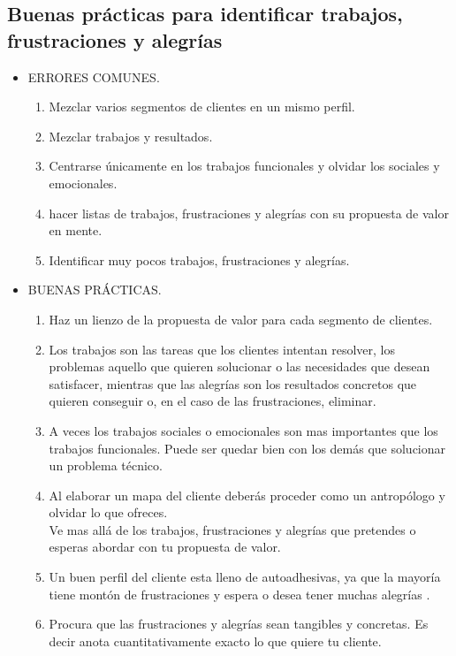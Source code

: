 \documentclass[11pt]{book}
\begin{document}
\subsection{Buenas prácticas para identificar trabajos, frustraciones y alegrías}
\begin{itemize}
\item ERRORES COMUNES.
\begin{enumerate}
\item Mezclar varios segmentos de clientes en un mismo perfil.
\item Mezclar trabajos y resultados.
\item Centrarse únicamente en los trabajos funcionales y olvidar los sociales y emocionales.
\item hacer listas de trabajos, frustraciones y alegrías con su propuesta de valor en mente.
\item Identificar muy pocos trabajos, frustraciones y alegrías.
\end{enumerate}
\item BUENAS PRÁCTICAS.
\begin{enumerate}
\item Haz un lienzo de la propuesta de valor para cada segmento de clientes.
\item Los trabajos son las tareas que los clientes intentan resolver, los problemas aquello que quieren solucionar o las necesidades que desean satisfacer, mientras que las alegrías son los resultados concretos que quieren conseguir o, en el caso de las frustraciones, eliminar.
\item A veces los trabajos sociales o emocionales son mas importantes que los trabajos funcionales. Puede ser quedar bien con los demás que solucionar un problema técnico.
\item Al elaborar un mapa del cliente deberás proceder como un antropólogo y olvidar lo que ofreces.\\
Ve mas allá de los trabajos, frustraciones y alegrías que pretendes o esperas abordar con tu propuesta de valor.
\item Un buen perfil del cliente esta lleno de autoadhesivas, ya que la mayoría tiene montón de frustraciones y espera o desea tener muchas alegrías .
\item Procura que las frustraciones y alegrías sean tangibles y concretas. Es decir anota cuantitativamente exacto lo que quiere tu cliente.
\end{enumerate}
\end{itemize}
\end{document}
